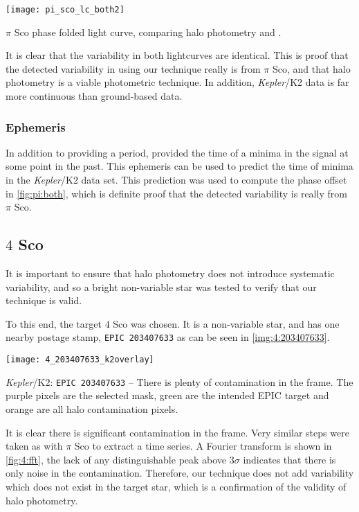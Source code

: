 \documentclass{book}
\begin{document}
\begin{staticfigure}
	\centering
		\texttt{[image: pi\_sco\_lc\_both2]}
	\caption{$\pi$ Sco phase folded light curve, comparing halo photometry and
			 \citet{2005JAD....11....7S}.}
	\label{fig:pi:both}
\end{staticfigure}

It is clear that the variability in both lightcurves are identical. This is
proof that the detected variability in using our technique really is from $\pi$
Sco, and that halo photometry is a viable photometric technique. In addition,
\textit{Kepler}/K2 data is far more continuous than ground-based data.

\subsubsection{Ephemeris}

In addition to providing a period, \citet{2005JAD....11....7S} provided the
time of a minima in the signal at some point in the past. This ephemeris can be
used to predict the time of minima in the \textit{Kepler}/K2 data set. This
prediction was used to compute the phase offset in \autoref{fig:pi:both}, which
is definite proof that the detected variability is really from $\pi$ Sco.

\subsection{$4$ Sco}

It is important to ensure that halo photometry does not introduce systematic
variability, and so a bright non-variable star was tested to verify that our
technique is valid.

To this end, the target $4$ Sco was chosen. It is a non-variable star, and
has one nearby postage stamp, \texttt{EPIC 203407633} as can be seen in
\autoref{img:4:203407633}.

\begin{staticfigure}
	\centering
		\texttt{[image: 4\_203407633\_k2overlay]}
	\caption{\textit{Kepler}/K2: \texttt{EPIC 203407633} -- There is plenty of
			 contamination in the frame. The purple pixels are the selected mask,
			 green are the intended EPIC target and orange are all halo contamination
			 pixels.}
	\label{img:4:203407633}
\end{staticfigure}

It is clear there is significant contamination in the frame. Very similar steps
were taken as with $\pi$ Sco to extract a time series. A Fourier transform is
shown in \autoref{fig:4:fft}, the lack of any distinguishable peak above $3\sigma$
indicates that there is only noise in the contamination. Therefore, our technique
does not add variability which does not exist in the target star, which is a
confirmation of the validity of halo photometry.
\end{document}
